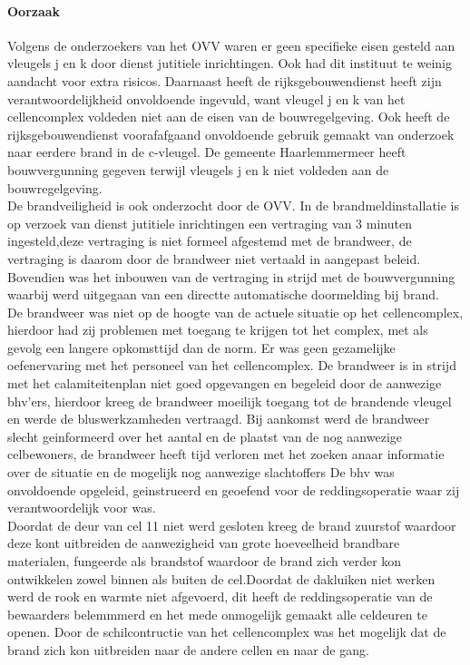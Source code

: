 \documentclass{article}
\begin{document}
	\paragraph{Oorzaak}
	\newline \indent 
	Volgens de onderzoekers van het OVV waren er geen specifieke eisen gesteld aan  vleugels j en k door dienst jutitiele inrichtingen. Ook had dit instituut te weinig aandacht voor extra risicos. Daarnaast heeft de rijksgebouwendienst heeft zijn verantwoordelijkheid onvoldoende ingevuld, want vleugel j en k van het cellencomplex voldeden niet aan de eisen van de bouwregelgeving. Ook heeft de rijksgebouwendienst  voorafafgaand onvoldoende gebruik gemaakt van onderzoek naar eerdere brand in de c-vleugel. De gemeente Haarlemmermeer heeft bouwvergunning gegeven terwijl vleugels  j en k niet voldeden aan de bouwregelgeving.\\
	De brandveiligheid is ook onderzocht door de OVV.
	In de brandmeldinstallatie is op verzoek van dienst jutitiele inrichtingen een vertraging van 3 minuten ingesteld,deze vertraging is niet formeel afgestemd met de brandweer, de vertraging is daarom door de brandweer niet vertaald in aangepast beleid. Bovendien was het inbouwen van de vertraging  in strijd met de bouwvergunning waarbij werd uitgegaan van een directte automatische doormelding bij brand. \\
	De brandweer was niet op de hoogte van de actuele situatie op het cellencomplex, hierdoor had zij problemen met toegang te krijgen tot het complex, met als gevolg een langere opkomsttijd dan de norm.
	Er was geen gezamelijke oefenervaring met het personeel van het cellencomplex.
	De brandweer is in strijd met het calamiteitenplan niet goed opgevangen en begeleid door de aanwezige bhv'ers, hierdoor kreeg de brandweer moeilijk toegang tot de brandende vleugel en werde de bluswerkzamheden vertraagd.
	Bij aankomst werd de brandweer slecht geinformeerd over het aantal en de plaatst van de nog aanwezige celbewoners, de brandweer heeft tijd verloren met het zoeken anaar informatie over de situatie en de mogelijk nog aanwezige slachtoffers
	De bhv was onvoldoende opgeleid, geinstrueerd en geoefend voor de reddingsoperatie waar zij verantwoordelijk voor was. \\
	Doordat de deur van cel 11 niet werd gesloten kreeg de brand zuurstof waardoor deze kont uitbreiden de aanwezigheid van grote hoeveelheid brandbare materialen, fungeerde als brandstof waardoor de brand zich verder kon ontwikkelen zowel binnen als buiten de cel.Doordat de dakluiken niet  werken werd de rook en warmte niet afgevoerd, dit heeft de reddingsoperatie van de bewaarders belemmmerd en het mede onmogelijk gemaakt alle celdeuren te openen. Door de schilcontructie van het cellencomplex was het mogelijk dat de brand zich kon uitbreiden naar de andere cellen en naar de gang.\\
\end{document}
